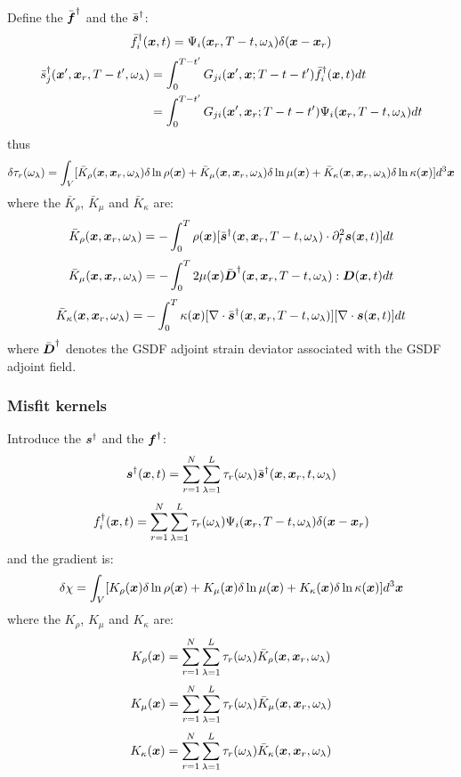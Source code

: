 Define the  $\bar{\boldsymbol{f}}^\dagger$
and the  $\bar{\boldsymbol{s}}^\dagger$:
\[ \bar f_i^\dagger(\boldsymbol{x},t)=\Psi_i(\boldsymbol{x}_r,T-t,\omega_\lambda)\delta(\boldsymbol{x}-\boldsymbol{x}_r) \]
\begin{align*}
  \bar s_j^\dagger(\boldsymbol{x}',\boldsymbol{x}_r,T-t',\omega_\lambda) & =\int_0^{T-t'}G_{ji}(\boldsymbol{x}',\boldsymbol{x};T-t-t')\bar f_i^\dagger(\boldsymbol{x},t)dt \\
    & =\int_0^{T-t'}G_{ji}(\boldsymbol{x}',\boldsymbol{x}_r;T-t-t')\Psi_i(\boldsymbol{x}_r,T-t,\omega_\lambda)dt
\end{align*}
thus
\[ \delta\tau_r(\omega_\lambda)=\int_V[\bar K_\rho(\boldsymbol{x},\boldsymbol{x}_r,\omega_\lambda)\delta\ln\rho(\boldsymbol{x})+\bar K_\mu(\boldsymbol{x},\boldsymbol{x}_r,\omega_\lambda)\delta\ln\mu(\boldsymbol{x})+\bar K_\kappa(\boldsymbol{x},\boldsymbol{x}_r,\omega_\lambda)\delta\ln\kappa(\boldsymbol{x})]d^3\boldsymbol{x} \]
where the  $\bar K_\rho$, $\bar K_\mu$ and $\bar K_\kappa$ are:
\[ \bar K_\rho(\boldsymbol{x},\boldsymbol{x}_r,\omega_\lambda)=-\int_0^T\rho(\boldsymbol{x})[\bar{\boldsymbol{s}}^\dagger(\boldsymbol{x},\boldsymbol{x}_r,T-t,\omega_\lambda)\cdot\partial_t^2\boldsymbol{s}(\boldsymbol{x},t)]dt \]
\[ \bar K_\mu(\boldsymbol{x},\boldsymbol{x}_r,\omega_\lambda)=-\int_0^T2\mu(\boldsymbol{x})\bar{\boldsymbol{D}}^\dagger(\boldsymbol{x},\boldsymbol{x}_r,T-t,\omega_\lambda):\boldsymbol{D}(\boldsymbol{x},t)dt \]
\[ \bar K_\kappa(\boldsymbol{x},\boldsymbol{x}_r,\omega_\lambda)=-\int_0^T\kappa(\boldsymbol{x})[\nabla\cdot\bar{\boldsymbol{s}}^\dagger(\boldsymbol{x},\boldsymbol{x}_r,T-t,\omega_\lambda)][\nabla\cdot\boldsymbol{s}(\boldsymbol{x},t)]dt \]
where $\bar{\boldsymbol{D}}^\dagger$ denotes the GSDF adjoint strain deviator
associated with the GSDF adjoint field.

\subsubsection{Misfit kernels}
Introduce the  $\boldsymbol{s}^\dagger$
and the  $\boldsymbol{f}^\dagger$:
\[ \boldsymbol{s}^\dagger(\boldsymbol{x},t)=\sum_{r=1}^N\sum_{\lambda=1}^L\tau_r(\omega_\lambda)\bar{\boldsymbol{s}}^\dagger(\boldsymbol{x},\boldsymbol{x}_r,t,\omega_\lambda) \]
\[ f_i^\dagger(\boldsymbol{x},t)=\sum_{r=1}^N\sum_{\lambda=1}^L\tau_r(\omega_\lambda)\Psi_i(\boldsymbol{x}_r,T-t,\omega_\lambda)\delta(\boldsymbol{x}-\boldsymbol{x}_r) \]
and the gradient is:
\[ \delta\chi=\int_V[K_\rho(\boldsymbol{x})\delta\ln\rho(\boldsymbol{x})+K_\mu(\boldsymbol{x})\delta\ln\mu(\boldsymbol{x})+K_\kappa(\boldsymbol{x})\delta\ln\kappa(\boldsymbol{x})]d^3\boldsymbol{x} \]
where the  $K_\rho$, $K_\mu$ and $K_\kappa$ are:
\[ K_\rho(\boldsymbol{x})=\sum_{r=1}^N\sum_{\lambda=1}^L\tau_r(\omega_\lambda)\bar K_\rho(\boldsymbol{x},\boldsymbol{x}_r,\omega_\lambda) \]
\[ K_\mu(\boldsymbol{x})=\sum_{r=1}^N\sum_{\lambda=1}^L\tau_r(\omega_\lambda)\bar K_\mu(\boldsymbol{x},\boldsymbol{x}_r,\omega_\lambda) \]
\[ K_\kappa(\boldsymbol{x})=\sum_{r=1}^N\sum_{\lambda=1}^L\tau_r(\omega_\lambda)\bar K_\kappa(\boldsymbol{x},\boldsymbol{x}_r,\omega_\lambda) \]

